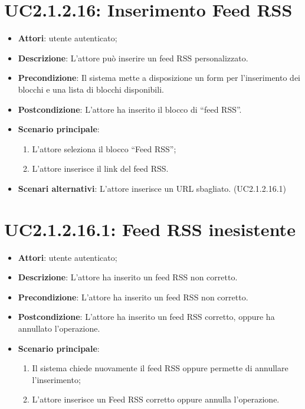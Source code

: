 \section{UC2.1.2.16: Inserimento Feed RSS}
\label{UC2.1.2.16}
\begin{itemize}
	\item \textbf{Attori}: utente autenticato;
	\item \textbf{Descrizione}: L'attore può inserire un feed RSS personalizzato.
	\item \textbf{Precondizione}: Il sistema mette a disposizione un form per l'inserimento dei blocchi e una lista di blocchi disponibili.
	\item \textbf{Postcondizione}: L'attore ha inserito il blocco di ``feed RSS''.
	\item \textbf{Scenario principale}:
	\begin{enumerate} \item L'attore seleziona il blocco ``Feed RSS'';  \item  L'attore inserisce il link del feed RSS.\end{enumerate}
	\item \textbf{Scenari alternativi}:
	L'attore inserisce un URL sbagliato. (UC2.1.2.16.1)
\end{itemize}

\section{UC2.1.2.16.1: Feed RSS inesistente}
\label{UC2.1.2.16.1}
\begin{itemize}
	\item \textbf{Attori}: utente autenticato;
	\item \textbf{Descrizione}: L'attore ha inserito un feed RSS non corretto.
	\item \textbf{Precondizione}: L'attore ha inserito un feed RSS non corretto.
	\item \textbf{Postcondizione}: L'attore ha inserito un feed RSS corretto, oppure ha annullato l'operazione.
	\item \textbf{Scenario principale}:
	\begin{enumerate} \item Il sistema chiede nuovamente il feed RSS oppure permette di annullare l'inserimento;  \item  L'attore inserisce un Feed RSS corretto oppure annulla l'operazione.\end{enumerate}
\end{itemize}

